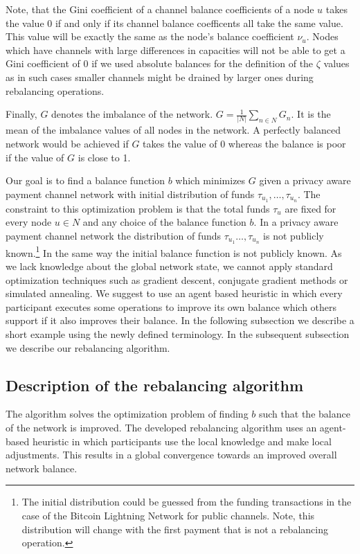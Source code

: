 \documentclass[a4paper]{paper}
\begin{document}
Note, that the Gini coefficient of a channel balance coefficients of a node $u$ takes the value $0$ if and only if its channel balance coefficents all take the same value.
This value will be exactly the same as the node's balance coefficient $\nu_u$.
Nodes which have channels with large differences in capacities will not be able to get a Gini coefficient of 0 if we used absolute balances for the definition of the $\zeta$ values as in such cases smaller channels might be drained by larger ones during rebalancing operations.

Finally, $G$ denotes the imbalance of the network. $G = \displaystyle{\frac{1}{|N|}\sum_{n\in N}G_n}$. It is the mean of the imbalance values of all nodes in the network.
A perfectly balanced network would be achieved if $G$ takes the value of $0$ whereas the balance is poor if the value of $G$ is close to 1.

Our goal is to find a balance function $b$ which minimizes $G$ given a privacy aware payment channel network with initial distribution of funds $\tau_{u_1},\dots,\tau_{u_n}$.
The constraint to this optimization problem is that the total funds $\tau_u$ are fixed for every node $u \in N$ and any choice of the balance function $b$.
In a privacy aware payment channel network the distribution of funds $\tau_{u_1}\dots,\tau_{u_n}$ is not publicly known.\footnote{The initial distribution could be guessed from the funding transactions in the case of the Bitcoin Lightning Network for public channels. Note, this distribution will change with the first payment that is not a rebalancing operation.}
In the same way the initial balance function is not publicly known.
As we lack knowledge about the global network state, we cannot apply standard optimization techniques such as gradient descent, conjugate gradient methods or simulated annealing.
We suggest to use an agent based heuristic in which every participant executes some operations to improve its own balance which others support if it also improves their balance.
In the following subsection we describe a short example using the newly defined terminology. In the subsequent subsection we describe our rebalancing algorithm.

\subsection{Description of the rebalancing algorithm}
\label{sec:Algorithm}

The algorithm solves the optimization problem of finding $b$ such that the balance of the network is improved.
The developed rebalancing algorithm uses an agent-based heuristic in which participants use the local knowledge and make local adjustments. 
This results in a global convergence towards an improved overall network balance. 
\end{document}
